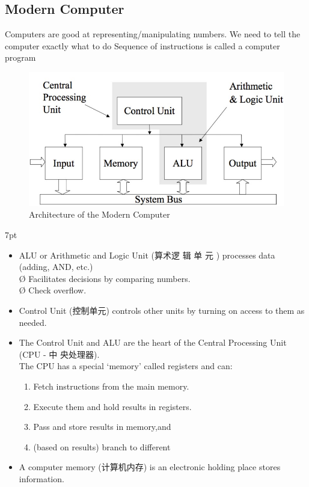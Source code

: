 \documentclass{book}
\newenvironment{formal1}{%
\def\FrameCommand{%
\hspace{1pt}%
{\color{DarkBlue}\vrule width 2pt}%
{\color{SteelBlue}\vrule width 4pt}%
\colorbox{formalshade}%
}%
\MakeFramed{\advance\hsize-\width\FrameRestore}%
\noindent\hspace{-4.55pt}%
\begin{adjustwidth}{}{7pt}%
\vspace{2pt}\vspace{2pt}%
}
{%
\vspace{2pt}\end{adjustwidth}\endMakeFramed%
}
\begin{document}
\color{darkgray}
 \begin{shaded}
 {\subsection[short]{Modern Computer}}
\end{shaded}
\color{black}
Computers are good at representing/manipulating
numbers. We need to tell the computer exactly what to do
Sequence of instructions is called a computer
program

\begin{figure}[!h]
    \centering
    \includegraphics[scale=0.3]{fig/9.jpeg}
    \caption{Architecture of the Modern Computer}
\end{figure} 
\begin{formal1}
\begin{itemize}
\item ALU or Arithmetic and Logic Unit (算术逻
辑 单 元 ) processes data (adding, AND,
etc.)\\
Ø Facilitates decisions by comparing
numbers.\\
Ø Check overflow.
\item Control Unit (控制单元) controls other
units by turning on access to them as
needed.
\item The Control Unit and ALU are the heart
of the Central Processing Unit (CPU - 中
央处理器).\\
The CPU has a special ‘memory’ called
registers and can:
\begin{enumerate}
    \item Fetch instructions from the main memory.
    \item Execute them and hold results in registers.
    \item Pass and store results in memory,and
    \item (based on results) branch to different
\end{enumerate}
\item A computer memory (计算机内存) is an
electronic holding place stores
information.\\
\end{itemize}
\end{formal1}
\end{document}
